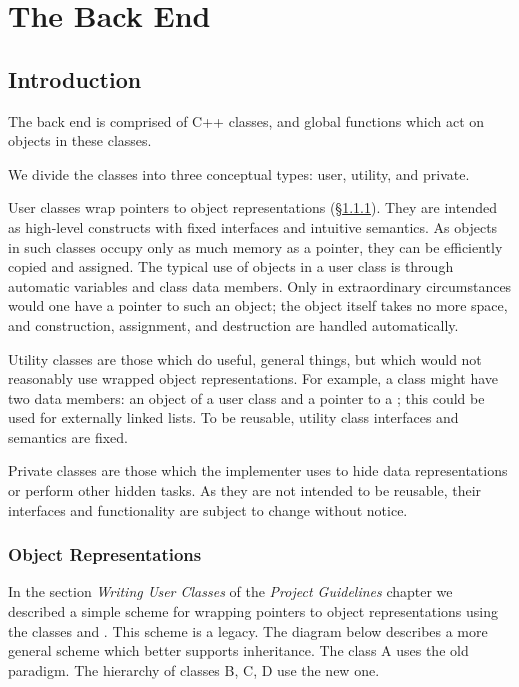 

\section{The Back End}

\subsection{Introduction}


The back end is comprised of C++ classes, and global functions which
act on objects in these classes.

We divide the classes into three conceptual types: user, utility, and
private.

\lskip
User classes wrap pointers to object representations
(\S\ref{obj_reps}). They are intended as high-level constructs with
fixed interfaces and intuitive semantics.  As objects in such classes
occupy only as much memory as a pointer, they can be efficiently
copied and assigned.  The typical use of objects in a user class is
through automatic variables and class data members. Only in
extraordinary circumstances would one have a pointer to such an
object; the object itself takes no more space, and construction,
assignment, and destruction are handled automatically.

\lskip
Utility classes are those which do useful, general things, but which
would not reasonably use wrapped object representations.  For example,
a  class might have two data members: an object of a user
class and a pointer to a ; this could be used for
externally linked lists. To be reusable, utility class interfaces and
semantics are fixed.

\lskip
Private classes are those which the implementer uses to hide data
representations or perform other hidden tasks. As they are not
intended to be reusable, their interfaces and functionality are
subject to change without notice.


\subsubsection{Object Representations}\label{obj_reps}

In the section {\em Writing User Classes} of the {\em Project
Guidelines} chapter we described a simple scheme for wrapping pointers
to object representations using the classes
 and . This scheme is a legacy. The
diagram below describes a more general scheme which better supports
inheritance. The class {\sf A} uses the old paradigm. The hierarchy of
classes {\sf B}, {\sf C}, {\sf D} use the new one.

